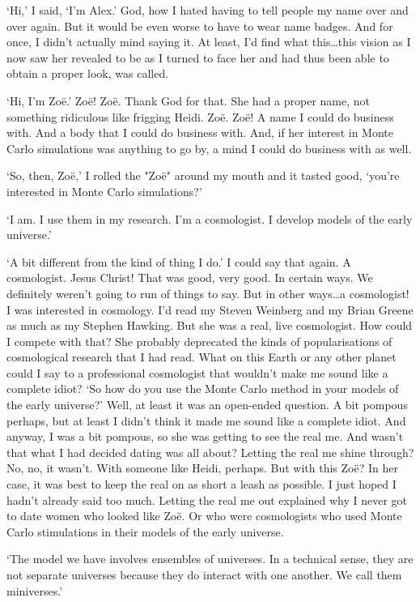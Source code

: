 `Hi,' I said, `I'm Alex.' God, how I hated having to tell people my
name over and over again. But it would be even worse to have to wear
name badges. And for once, I didn't actually mind saying it. At
least, I'd find what this\dots this {\twelveit vision\/} as I now
saw her revealed to be as I turned to face her and had thus been
able to obtain a proper look, was called.

`Hi, I'm Zoë.' Zoë! Zoë. Thank God for that. She had a
proper name, not something ridiculous like frigging Heidi. Zoë.
Zoë! A name I could do business with. And a body that I could do
business with. And, if her interest in Monte Carlo simulations was
anything to go by, a mind I could do business with as well.

`So, then, Zoë,' I rolled the "Zoë" around my mouth and it
tasted good, `you're interested in Monte Carlo simulations?'

`I am. I use them in my research. I'm a cosmologist. I develop
models of the early universe.'

`A bit different from the kind of thing I do.' I could say that
again. A cosmologist. Jesus Christ! That was good, {\twelveit very}
good. In certain ways. We definitely weren't going to run of things
to say. But in other ways\dots a cosmologist! I was interested in
cosmology. I'd read my Steven Weinberg and my Brian Greene as much
as my Stephen Hawking. But she was a real, live cosmologist. How
could I compete with that? She probably deprecated the kinds of
popularisations of cosmological research that I had read. What on
this Earth or any other planet could I say to a professional
cosmologist that wouldn't make me sound like a complete idiot? `So
how do you use the Monte Carlo method in your models of the early
universe?' Well, at least it was an open-ended question. A bit
pompous perhaps, but at least I didn't {\twelveit think\/} it made
me sound like a complete idiot. And anyway, I was a bit pompous, so
she was getting to see the real me. And wasn't that what I had
decided dating was all about? Letting the real me shine through? No,
no, it wasn't. With someone like Heidi, perhaps. But with this Zoë?
In her case, it was best to keep the real on as short a leash as
possible. I just hoped I hadn't already said too much. Letting the
real me out explained why I never got to date women who looked like
Zoë. Or who were cosmologists who used Monte Carlo stimulations
in their models of the early universe.

`The model we have involves ensembles of universes. In a technical
sense, they are not separate universes because they do interact with
one another. We call them miniverses.'

